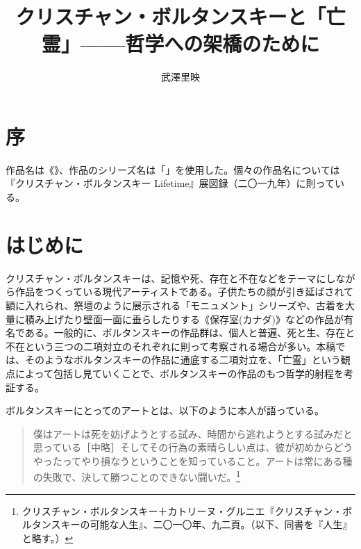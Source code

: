 \documentclass[b5j,twoside,twocolumn]{utarticle}
\title{\tbaselineshift =4.0pt クリスチャン・ボルタンスキーと「亡霊」------哲学への架橋のために}
\author{武澤里映}
\date{\vspace{-5mm}}
\makeatletter
\def\yakuchu{%
\@ifnextchar[\@xfootnote %
{\stepcounter{yakuchu}%
\protected@xdef\@thefnmark{\theyakuchu}%
\@footnotemark\@footnotetext}}
\makeatother
\begin{document}
\maketitle

\setlength{\footskip}{-2mm}
\chead[]{}
\lfoot[]{\thepage{}}
\cfoot[]{}
\rfoot[\thepage{}]{}

\let\yakuchu=\endnote
\renewcommand{\footnoterule}{\noindent\rule{100mm}{0.3mm}\vskip2mm}
\thispagestyle{fancy}
\section*{序}

作品名は《》、作品のシリーズ名は「」を使用した。個々の作品名については『クリスチャン・ボルタンスキー Lifetime』展図録（二〇一九年）に則っている。
\setcounter{section}{0}
\section{はじめに}
クリスチャン・ボルタンスキーは、記憶や死、存在と不在などをテーマにしながら作品をつくっている現代アーティストである。子供たちの顔が引き延ばされて額に入れられ、祭壇のように展示される「モニュメント」シリーズや、古着を大量に積み上げたり壁面一面に垂らしたりする《保存室(カナダ)》などの作品が有名である。一般的に、ボルタンスキーの作品群は、個人と普遍、死と生、存在と不在という三つの二項対立のそれぞれに則って考察される場合が多い。本稿では、そのようなボルタンスキーの作品に通底する二項対立を、「亡霊」という観点によって包括し見ていくことで、ボルタンスキーの作品のもつ哲学的射程を考証する。


ボルタンスキーにとってのアートとは、以下のように本人が語っている。
\begin{quote}
僕はアートは死を妨げようとする試み、時間から逃れようとする試みだと思っている［中略］そしてその行為の素晴らしい点は、彼が初めからどうやったってやり損なうということを知っていること。アートは常にある種の失敗で、決して勝つことのできない闘いだ。\footnote{クリスチャン・ボルタンスキー＋カトリーヌ・グルニエ『クリスチャン・ボルタンスキーの可能な人生』、二〇一〇年、九二頁。（以下、同書を『人生』と略す。）}
\end{quote}
\end{document}
